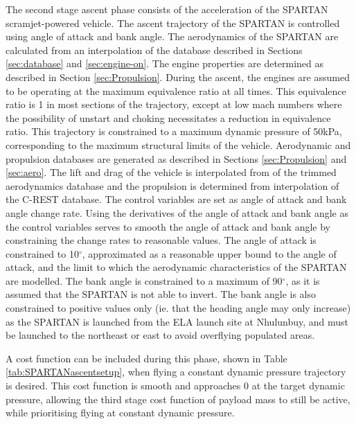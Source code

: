 The second stage ascent phase consists of the acceleration of the SPARTAN scramjet-powered vehicle. 
The ascent trajectory of the SPARTAN is controlled using angle of attack and bank angle. The aerodynamics of the SPARTAN are calculated from an interpolation of the database described in Sections \ref{sec:database} and \ref{sec:engine-on}. The engine properties are determined as described in Section \ref{sec:Propulsion}.
During the ascent, the engines are assumed to be operating at the maximum equivalence ratio at all times. This equivalence ratio is 1 in most sections of the trajectory, except at low mach numbers where the possibility of unstart and choking necessitates a reduction in equivalence ratio. This trajectory is constrained to a maximum dynamic pressure of 50kPa, corresponding to the maximum structural limits of the vehicle. Aerodynamic and propulsion databases are generated as described in Sections \ref{sec:Propulsion} and \ref{sec:aero}. The lift and drag of the vehicle is interpolated from of the trimmed aerodynamics database and the propulsion is determined from interpolation of the C-REST database. 
The control variables are set as angle of attack and bank angle change rate. Using the derivatives of the angle of attack and bank angle as the control variables serves to smooth the angle of attack and bank angle by constraining the change rates to reasonable values. The angle of attack is constrained to 10$^\circ$, approximated as a reasonable upper bound to the angle of attack, and the limit to which the aerodynamic characteristics of the SPARTAN are modelled. The bank angle is constrained to a maximum of 90$^\circ$, as it is assumed that the SPARTAN is not able to invert. The bank angle is also constrained to positive values only (ie. that the heading angle may only increase) as the SPARTAN is launched from the ELA launch site at Nhulunbuy, and must be launched to the northeast or east to avoid overflying populated areas. 

A cost function can be included during this phase, shown in Table \ref{tab:SPARTANascentsetup}, when flying a constant dynamic pressure trajectory is desired. This cost function is smooth and approaches 0 at the target dynamic pressure, allowing the third stage cost function of payload mass to still be active, while prioritising flying at constant dynamic pressure. 


